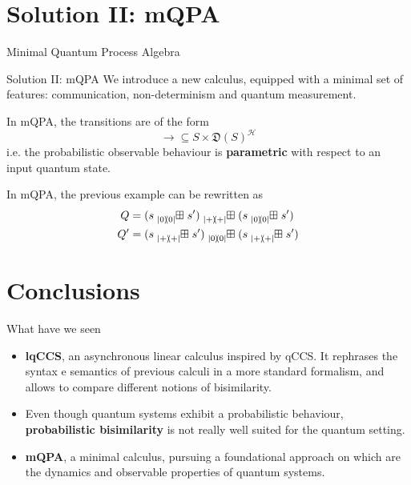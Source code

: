 \documentclass{beamer}
\newcommand{\ketbra}[2]{\ket{#1}\!\!\bra{#2}}
\newcommand{\qsum}[1]{\tensor[_{#1}]{\boxplus}{}}
\newcommand{\distr}{\mathfrak{D}}
\begin{document}
\section{Solution II: mQPA}
\begin{frame}{Minimal Quantum Process Algebra}
\begin{block}{Solution II: mQPA}
We introduce a new calculus, equipped with a minimal set of features: communication, non-determinism and quantum measurement.

In mQPA, the transitions are of the form
\[\rightarrow \subseteq S \times \distr(S)^\mathcal{H}\]
i.e. the probabilistic observable behaviour is \textbf{parametric} with respect to an input quantum state.		
\end{block}
\pause
In mQPA, the previous example can be rewritten as
\begin{align*}
		Q &= (s \qsum{\ketbra{0}{0}} s') \qsum{\ketbra{+}{+}} (s \qsum{\ketbra{0}{0}} s')\\
		Q' &= (s \qsum{\ketbra{+}{+}} s') \qsum{\ketbra{0}{0}} (s \qsum{\ketbra{+}{+}} s')
\end{align*}
\end{frame}


\section{Conclusions}
\begin{frame}{What have we seen}
\begin{itemize}
\item<1-> \textbf{lqCCS}, an asynchronous linear calculus inspired by  qCCS. It rephrases the syntax e semantics of previous calculi in a more standard formalism, and allows to compare different notions of bisimilarity. 
\item<2-> Even though quantum systems exhibit a probabilistic behaviour, \textbf{probabilistic bisimilarity} is not really well suited for the quantum setting. 
\item<3-> \textbf{mQPA}, a minimal calculus, pursuing a foundational approach on which are the dynamics and observable properties of quantum systems.
\end{itemize}
\end{frame}
\end{document}
